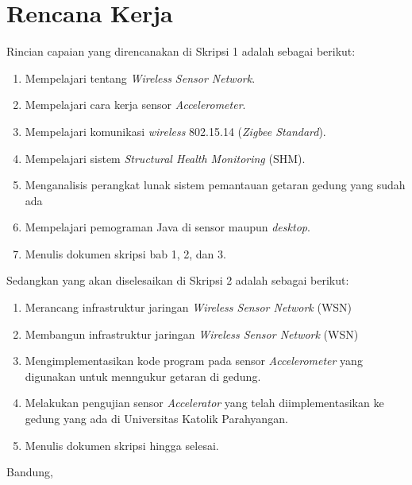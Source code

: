 \documentclass[a4paper,twoside]{article}
\begin{document}
\section{Rencana Kerja}
Rincian capaian yang direncanakan di Skripsi 1 adalah sebagai berikut:
\begin{enumerate}
\item Mempelajari tentang \textit{Wireless Sensor Network}.
\item Mempelajari cara kerja sensor \textit{Accelerometer}.
\item Mempelajari komunikasi \textit{wireless} 802.15.14 (\textit{Zigbee Standard}).
\item Mempelajari sistem \textit{Structural Health Monitoring} (SHM).
\item Menganalisis perangkat lunak sistem pemantauan getaran gedung yang sudah ada
\item Mempelajari pemograman Java di sensor maupun \textit{desktop}.
\item Menulis dokumen skripsi bab 1, 2, dan 3.
\end{enumerate}

Sedangkan yang akan diselesaikan di Skripsi 2 adalah sebagai berikut:
\begin{enumerate}
\item Merancang infrastruktur jaringan \textit{Wireless Sensor Network} (WSN)
\item Membangun infrastruktur jaringan \textit{Wireless Sensor Network} (WSN)
\item Mengimplementasikan kode program pada sensor \textit{Accelerometer} yang digunakan untuk menngukur getaran di gedung.
\item Melakukan pengujian sensor \textit{Accelerator} yang telah diimplementasikan ke gedung yang ada di Universitas Katolik Parahyangan. 
\item Menulis dokumen skripsi hingga selesai.
\end{enumerate}

\vspace{1cm}
\centering Bandung, \tanggal\\
\vspace{2cm} \nama \\ 
\vspace{1cm}
\end{document}
